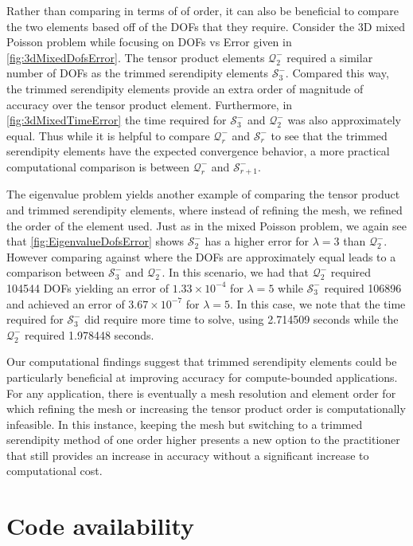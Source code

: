 \documentclass[format=acmsmall,screen,timestamp=false,a4paper]{acmart}
\begin{document}
Rather than comparing in terms of of order, it can also be beneficial to compare the two elements based off of the DOFs that they require.  Consider the 3D mixed Poisson problem while focusing on DOFs vs Error given in \cref{fig:3dMixedDofsError}.  The tensor product elements $\mathcal{Q}^-_2$ required a similar number of DOFs as the trimmed serendipity elements $\mathcal{S}^-_3$.  Compared this way, the trimmed serendipity elements provide an extra order of magnitude of accuracy over the tensor product element.  Furthermore, in \cref{fig:3dMixedTimeError} the time required for $\mathcal{S}^-_3$ and $\mathcal{Q}^-_2$ was also approximately equal.   Thus while it is helpful to compare $\mathcal{Q}^-_r$ and $\mathcal{S}^-_r$ to see that the trimmed serendipity elements have the expected convergence behavior, a more practical computational comparison is between $\mathcal{Q}^-_r$ and $\mathcal{S}_{r+1}^-$.  

The eigenvalue problem yields another example of comparing the tensor product and trimmed serendipity elements, where instead of refining the mesh, we  refined the order of the element used.  Just as in the mixed Poisson problem, we again see that \cref{fig:EigenvalueDofsError} shows $\mathcal{S}^-_2$ has a higher error for $\lambda = 3$ than $\mathcal{Q}^-_2$.  However comparing against where the DOFs are approximately equal leads to a comparison between $\mathcal{S}^-_3$ and $\mathcal{Q}^-_2$.  In this scenario, we had that $\mathcal{Q}^-_2$ required 104544 DOFs yielding an error of $1.33 \times 10^{-4}$ for $\lambda = 5$ while $\mathcal{S}^-_3$ required 106896 and achieved an error of $3.67 \times 10^{-7}$ for $\lambda = 5$.  In this case, we note that the time required for $\mathcal{S}^-_3$ did require more time to solve, using 2.714509 seconds while the $\mathcal{Q}^-_2$ required 1.978448 seconds.


Our computational findings suggest that trimmed serendipity elements could be particularly beneficial at improving accuracy for compute-bounded applications.  For any application, there is eventually a mesh resolution and element order for which refining the mesh or increasing the tensor product order is computationally infeasible.  In this instance, keeping the mesh but switching to a trimmed serendipity method of one order higher presents a new option to the practitioner that still provides an increase in accuracy without a significant increase to computational cost.


\section*{Code availability}
\end{document}
